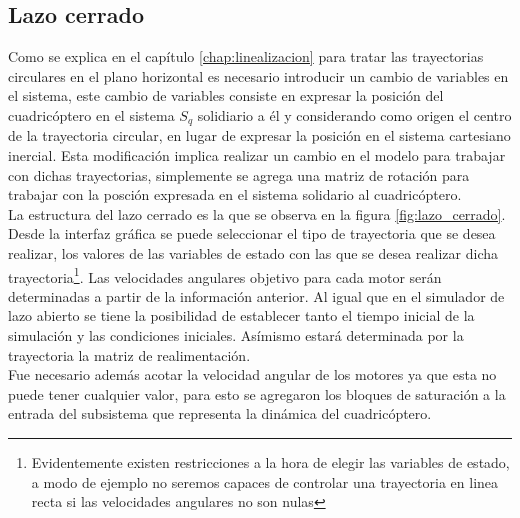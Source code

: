 \documentclass[main]{subfiles}
\begin{document}
\subsection{Lazo cerrado}

Como se explica en el cap\'itulo \ref{chap:linealizacion} para tratar las trayectorias circulares en el plano horizontal es necesario introducir un cambio de variables en el sistema, este cambio de variables consiste en expresar la posici\'on del cuadric\'optero en el sistema $S_q$ solidiario a \'el y considerando como origen el centro de la trayectoria circular, en lugar de expresar la posici\'on en el sistema cartesiano inercial. Esta modificaci\'on implica realizar un cambio en el modelo para trabajar con dichas trayectorias, simplemente se agrega una matriz de rotaci\'on para trabajar con la posci\'on expresada en el sistema solidario al cuadric\'optero.\\ 

La estructura del lazo cerrado es la que se observa en la figura \ref{fig:lazo_cerrado}. Desde la interfaz gr\'afica se puede seleccionar el tipo de trayectoria que se desea realizar, los valores de las variables de estado con las que se desea realizar dicha trayectoria\footnote{Evidentemente existen restricciones a la hora de elegir las variables de estado, a modo de ejemplo no seremos capaces de controlar una trayectoria en linea recta si las velocidades angulares no son nulas}. Las velocidades angulares objetivo para cada motor ser\'an determinadas a partir de la informaci\'on anterior. Al igual que en el simulador de lazo abierto se tiene la posibilidad de establecer tanto el tiempo inicial de la simulaci\'on y las condiciones iniciales. As\'imismo estar\'a determinada por la trayectoria la matriz de realimentaci\'on.\\

Fue necesario adem\'as acotar la velocidad angular de los motores ya que esta no puede tener cualquier valor, para esto se agregaron los bloques de saturaci\'on a la entrada del subsistema que representa la din\'amica del cuadric\'optero.
\end{document}
